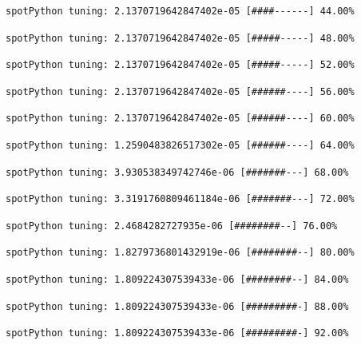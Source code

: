 \documentclass[
  letterpaper,
  DIV=11,
  numbers=noendperiod]{scrreprt}
\begin{document}
\begin{verbatim}
spotPython tuning: 2.1370719642847402e-05 [####------] 44.00% 
\end{verbatim}

\begin{verbatim}
spotPython tuning: 2.1370719642847402e-05 [#####-----] 48.00% 
\end{verbatim}

\begin{verbatim}
spotPython tuning: 2.1370719642847402e-05 [#####-----] 52.00% 
\end{verbatim}

\begin{verbatim}
spotPython tuning: 2.1370719642847402e-05 [######----] 56.00% 
\end{verbatim}

\begin{verbatim}
spotPython tuning: 2.1370719642847402e-05 [######----] 60.00% 
\end{verbatim}

\begin{verbatim}
spotPython tuning: 1.2590483826517302e-05 [######----] 64.00% 
\end{verbatim}

\begin{verbatim}
spotPython tuning: 3.930538349742746e-06 [#######---] 68.00% 
\end{verbatim}

\begin{verbatim}
spotPython tuning: 3.3191760809461184e-06 [#######---] 72.00% 
\end{verbatim}

\begin{verbatim}
spotPython tuning: 2.4684282727935e-06 [########--] 76.00% 
\end{verbatim}

\begin{verbatim}
spotPython tuning: 1.8279736801432919e-06 [########--] 80.00% 
\end{verbatim}

\begin{verbatim}
spotPython tuning: 1.809224307539433e-06 [########--] 84.00% 
\end{verbatim}

\begin{verbatim}
spotPython tuning: 1.809224307539433e-06 [#########-] 88.00% 
\end{verbatim}

\begin{verbatim}
spotPython tuning: 1.809224307539433e-06 [#########-] 92.00% 
\end{verbatim}
\end{document}
